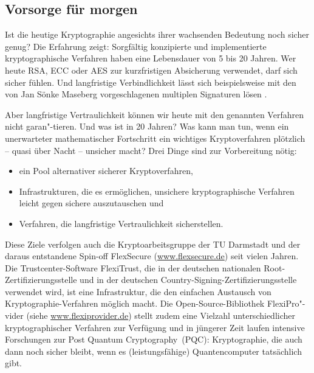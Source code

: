\begin{refsegment}
\section{Vorsorge für morgen}
\label{vorsorge}

Ist die heutige Kryptographie angesichts ihrer
wachsenden Bedeutung noch sicher genug? Die Erfahrung
zeigt: Sorgfältig konzipierte und implementierte kryptographische
Verfahren haben eine Lebensdauer von 5 bis
20 Jahren. Wer heute RSA, ECC oder AES zur kurzfristigen
Absicherung verwendet, darf sich sicher fühlen. Und
langfristige Verbindlichkeit lässt sich beispielsweise mit
den von Jan Sönke Maseberg vorgeschlagenen multiplen
Signaturen lösen \cite{maseberg-thesis:2002}.

Aber langfristige Vertraulichkeit können wir
heute mit den genannten Verfahren nicht garan"-tieren.
Und was ist in 20 Jahren? Was kann man tun, wenn ein
unerwarteter mathematischer Fortschritt ein wichtiges
Kryptoverfahren plötzlich -- quasi über Nacht -- unsicher
macht? Drei Dinge sind zur Vorbereitung nötig:

\begin{itemize}
\item ein Pool alternativer sicherer Kryptoverfahren,
\item Infrastrukturen, die es ermöglichen, unsichere kryptographische
   Verfahren leicht gegen sichere auszutauschen und
\item Verfahren, die langfristige Vertraulichkeit sicherstellen.
\end{itemize}


Diese Ziele verfolgen auch die Kryptoarbeitsgruppe der TU Darmstadt und
der daraus entstandene Spin-off FlexSecure (\url{www.flexsecure.de})
seit vielen Jahren. Die Trustcenter-Software FlexiTrust, die in der
deutschen nationalen Root-Zertifizierungsstelle und in der deutschen
Country-Signing-Zertifizierungsstelle verwendet wird, ist eine
Infrastruktur, die den einfachen Austausch von Kryptographie-Verfahren möglich
macht. Die Open-Source-Bibliothek FlexiPro"-vider
(siehe \url{www.flexiprovider.de}) stellt zudem eine Vielzahl
unterschiedlicher kryptographischer Verfahren zur Verfügung und in
jüngerer Zeit laufen intensive Forschungen zur \glqq Post Quantum
Cryptography\grqq~(PQC):
Kryptographie, die auch dann noch sicher bleibt, wenn es
(leistungsfähige) Quantencomputer tatsächlich gibt.


\end{refsegment}
